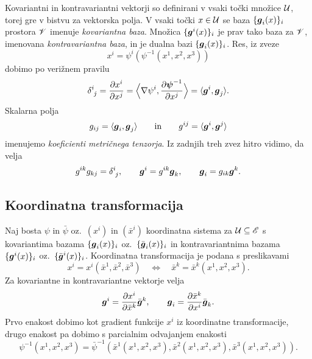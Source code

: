Kovariantni in kontravariantni vektorji so definirani v vsaki točki množice $\mathcal U$, torej
gre v bistvu za vektorska polja. V vsaki točki $x\in \mathcal U$ se baza $\{\boldsymbol g_i(x)\}_i$ prostora $\mathscr V$
imenuje \emph{kovariantna baza}.
Množica $\{\boldsymbol g^i(x)\}_i$ je prav tako baza za $\mathscr V$, imenovana \emph{kontravariantna baza},
in je dualna bazi $\{\boldsymbol g_i(x)\}_i$. Res, iz zveze
\[ x^i=\psi^i(\psi^{-1}(x^1,x^2,x^3)) \]
dobimo po verižnem pravilu
\begin{equation} \label{e:gigj}
	\topbot{\delta}{i}{j}=\frac{\partial x^i}{\partial x^j}=
	\Big<\nabla\psi^i,\frac{\partial\vek{\psi}^{-1}}{\partial x^j}\Big>=\langle\vek{g}^i,\vek{g}_j\rangle.
\end{equation}
Skalarna polja
\[ g_{ij}=\langle\boldsymbol g_i,\boldsymbol g_j\rangle\qquad\textrm{in}\qquad g^{ij}=\langle\boldsymbol g^i,\boldsymbol g^j\rangle \]
imenujemo \emph{koeficienti metričnega tenzorja}. 
Iz zadnjih treh zvez hitro vidimo, da velja
\begin{equation} \label{e:relzag}
	g^{ik}g_{kj}=\topbot{\delta}{i}{j},\qquad \vek{g}^i=g^{ik}\vek{g}_k,\qquad \vek{g}_i=g_{ik}\vek{g}^k.
\end{equation}


\subsection{Koordinatna transformacija}


Naj bosta $\psi$ in $\bar{\psi}$ oz.~$(x^i)$ in $(\bar{x}^i)$ koordinatna sistema za
$\mathcal U\subseteq\mathscr E$ s kovariantima bazama $\{\boldsymbol g_i(x)\}_i$ oz.~$\{\bar{\boldsymbol g}_i(x)\}_i$
in kontravariantnima bazama $\{\boldsymbol g^i(x)\}_i$ oz.~$\{\bar{\boldsymbol g}^i(x)\}_i$.
Koordinatna transformacija je podana s preslikavami
\[
	x^i=x^i(\bar{x}^1,\bar{x}^2,\bar{x}^3)\quad\Longleftrightarrow\quad
	\bar{x}^k=\bar{x}^k(x^1,x^2,x^3).
\]
Za kovariantne in kontravariantne vektorje velja
\begin{equation} \label{e:gtog}
	\boldsymbol g^i=\frac{\partial x^i}{\partial\bar{x}^k}\bar{\boldsymbol g}^k,\qquad
	\boldsymbol g_i=\frac{\partial\bar{x}^k}{\partial x^i}\bar{\boldsymbol g}_k.
\end{equation}
Prvo enakost dobimo kot gradient funkcije $x^i$ iz koordinatne transformacije,
drugo enakost pa dobimo s parcialnim odvajanjem enakosti
\[ 
	\psi^{-1}(x^1,x^2,x^3)=\bar{\psi}^{-1}(\bar{x}^1(x^1,x^2,x^3),
	\bar{x}^2(x^1,x^2,x^3),\bar{x}^3(x^1,x^2,x^3)).
\]

